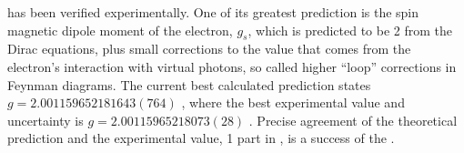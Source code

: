 \QED has been verified experimentally. One of its greatest prediction is the spin magnetic dipole moment of the electron, $g_{s}$, which is predicted to be  2 from the Dirac equations, plus small corrections to the value that comes from the electron's interaction with virtual photons, so called higher ``loop'' corrections in Feynman diagrams. The current best calculated \QED prediction states $g=2.001159652181643(764)$ \cite{Aoyama:2014sxa}, where the best experimental value and uncertainty is $g = 2.00115965218073(28)$ \cite{Hanneke:2010au}. Precise agreement of the theoretical prediction and the experimental value, 1 part in , is a success of the \QED.

